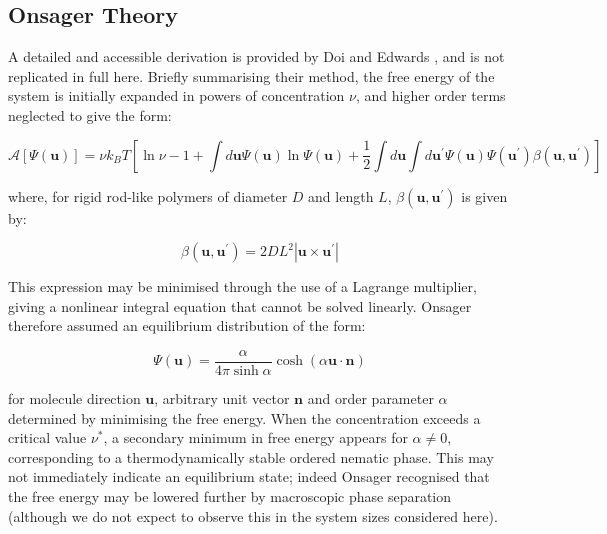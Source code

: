 \documentclass[11pt, a4paper]{article} %
\begin{document}
\begin{appendices}

\section{Onsager Theory} \label{sec:OnsagerAppendix}
A detailed and accessible derivation is provided by Doi and Edwards \cite{Doi1988}, and is not replicated in full here. Briefly summarising their method, the free energy of the system is initially expanded in powers of concentration $\nu$, and higher order terms neglected to give the form:

\begin{equation} \label{eq:OnsagerFreeEnergy}
\mathcal{A}[\Psi(\boldsymbol{u})] = \nu k_{B}T \left[ \ln\nu - 1 + \int d\boldsymbol{u} \Psi(\boldsymbol{u}) \ln \Psi(\boldsymbol{u}) + \frac{1}{2} \int d\boldsymbol{u} \int d\boldsymbol{u^{\prime}} \Psi(\boldsymbol{u}) \Psi(\boldsymbol{u^{\prime}}) \beta(\boldsymbol{u}, \boldsymbol{u^{\prime}})  \right]
\end{equation}

where, for rigid rod-like polymers of diameter $D$ and length $L$, $\beta(\boldsymbol{u}, \boldsymbol{u^{\prime}})$ is given by:

\begin{equation}
\beta(\boldsymbol{u}, \boldsymbol{u^{\prime}}) = 2DL^{2} \left\lvert \boldsymbol{u} \times \boldsymbol{u^{\prime}} \right\rvert
\end{equation} 

This expression may be minimised through the use of a Lagrange multiplier, giving a nonlinear integral equation that cannot be solved linearly. Onsager therefore assumed an equilibrium distribution of the form:

\begin{equation}
\Psi(\boldsymbol{u}) = \frac{\alpha}{4\pi\sinh\alpha} \cosh (\alpha \boldsymbol{u} \cdot \boldsymbol{n})
\end{equation}

for molecule direction $\boldsymbol{u}$, arbitrary unit vector $\boldsymbol{n}$ and order parameter $\alpha$ determined by minimising the free energy. When the concentration exceeds a critical value $\nu^{*}$, a secondary minimum in free energy appears for $\alpha \neq 0$, corresponding to a thermodynamically stable ordered nematic phase. This may not immediately indicate an equilibrium state; indeed Onsager recognised that the free energy may be lowered further by macroscopic phase separation (although we do not expect to observe this in the system sizes considered here). 


\end{appendices}
\end{document}
